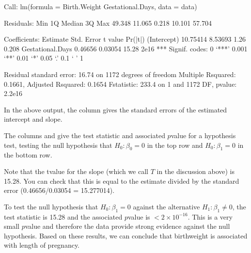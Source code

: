 \documentclass[letterpaper,10pt,english]{jupyterBook}
\begin{document}
\begin{sphinxVerbatim}[commandchars=\\\{\}]
Call:
lm(formula = Birth.Weight \PYGZti{} Gestational.Days, data = data)

Residuals:
    Min      1Q  Median      3Q     Max 
\PYGZhy{}49.348 \PYGZhy{}11.065   0.218  10.101  57.704 

Coefficients:
                  Estimate Std. Error t value Pr(\PYGZgt{}|t|)    
(Intercept)      \PYGZhy{}10.75414    8.53693   \PYGZhy{}1.26    0.208    
Gestational.Days   0.46656    0.03054   15.28   \PYGZlt{}2e\PYGZhy{}16 ***
\PYGZhy{}\PYGZhy{}\PYGZhy{}
Signif. codes:  0 ‘***’ 0.001 ‘**’ 0.01 ‘*’ 0.05 ‘.’ 0.1 ‘ ’ 1

Residual standard error: 16.74 on 1172 degrees of freedom
Multiple R\PYGZhy{}squared:  0.1661,	Adjusted R\PYGZhy{}squared:  0.1654 
F\PYGZhy{}statistic: 233.4 on 1 and 1172 DF,  p\PYGZhy{}value: \PYGZlt{} 2.2e\PYGZhy{}16
\end{sphinxVerbatim}

\sphinxAtStartPar
In the above output, the column  gives the standard errors of the estimated intercept and slope.

\sphinxAtStartPar
The columns  and  give the test statistic and associated \(p\)\sphinxhyphen{}value for a hypothesis test, testing the null hypothesis that \(H_0: \beta_0 = 0\) in the top row and \(H_0: \beta_1 = 0\) in the bottom row.

\sphinxAtStartPar
Note that the t\sphinxhyphen{}value for the slope (which we call \(T\) in the discussion above) is 15.28. You can check that this is equal to the estimate divided by the standard error (0.46656/0.03054 = 15.277014).

\sphinxAtStartPar
To test the null hypothesis that \(H_0: \beta_1=0\) against the alternative \(H_1:\beta_1 \neq  0\), the test statistic is 15.28 and the associated \(p\)\sphinxhyphen{}value is \(<2\times10^{-16}\). This is a very small \(p\)\sphinxhyphen{}value and therefore the data provide strong evidence against the null hypothesis. Based on these results, we can conclude that birthweight is associated with length of pregnancy.
\end{document}
